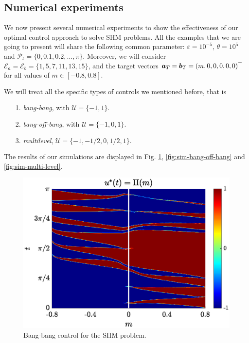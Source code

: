 \documentclass[twocolumn]{autart}    %
\begin{document}
\subsection{Numerical experiments}

We now present several numerical experiments to show the effectiveness of our optimal control approach to solve SHM problems. All the examples that we are going to present will share the following common parameter: $\varepsilon = 10^{-5}$, $\theta = 10^5$ and $\mathcal{P}_t = \{0,0.1,0.2,\dots,\pi\}$. Moreover, we will consider $\mathcal{E}_a = \mathcal{E}_b = \{1,5,7,11,13,15\}$, and the target vectors $\bm{a}_T = \bm{b}_T = (m,0,0,0,0,0)^\top$ for all values of $m \in [-0.8,0.8]$. 

We will treat all the specific types of controls we mentioned before, that is
\begin{itemize}
	\item[1.] \emph{bang-bang}, with $\mathcal{U} = \{-1,1\}$.
	\vspace{0.05cm}
	\item[2.] \emph{bang-off-bang}, with $\mathcal{U} = \{-1,0,1\}$. 
	\vspace{0.05cm}
	\item[3.] \textit{multilevel}, $\mathcal{U} = \{-1,-1/2,0,1/2,1\}$.
\end{itemize}

The results of our simulations are displayed in Fig. \ref{fig:sim-bang-bang}, \ref{fig:sim-bang-off-bang} and \ref{fig:sim-multi-level}.

\begin{figure}[ht!]
    \hspace{0.05em}
    \includegraphics[scale=0.525]{img/fig05.eps}
    \caption{Bang-bang control for the SHM problem.}\label{fig:sim-bang-bang}
\end{figure} 
\end{document}
